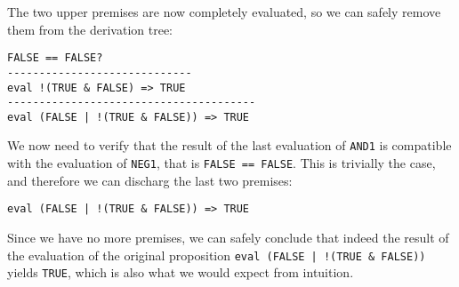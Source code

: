 The two upper premises are now completely evaluated, so we can safely remove them from the derivation tree:

\begin{lstlisting}
FALSE == FALSE?
-----------------------------
eval !(TRUE & FALSE) => TRUE
---------------------------------------
eval (FALSE | !(TRUE & FALSE)) => TRUE
\end{lstlisting}

We now need to verify that the result of the last evaluation of \texttt{AND1} is compatible with the evaluation of \texttt{NEG1}, that is \texttt{FALSE == FALSE}. This is trivially the case, and therefore we can discharg the last two premises:

\begin{lstlisting}
eval (FALSE | !(TRUE & FALSE)) => TRUE
\end{lstlisting}

Since we have no more premises, we can safely conclude that indeed the result of the evaluation of the original proposition \texttt{eval (FALSE | !(TRUE \& FALSE))} yields \texttt{TRUE}, which is also what we would expect from intuition.

